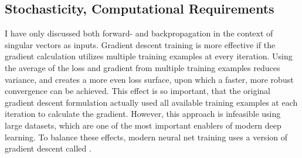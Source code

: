			
		\subsection{Stochasticity, Computational Requirements}
	
			I have only discussed both forward- and backpropagation in the context of singular vectors as inputs.
			Gradient descent training is more effective if the gradient calculation utilizes multiple training examples at every iteration.
			Using the average of the loss and gradient from multiple training examples reduces variance, and creates a more even loss surface, upon which a faster, more robust convergence can be achieved.
			This effect is so important, that the original gradient descent formulation actually used all available training examples at each iteration to calculate the gradient.
			However, this approach is infeasible using large datasets, which are one of the most important enablers of modern deep learning.
			To balance these effects, modern neural net training uses a version of gradient descent called .
			
